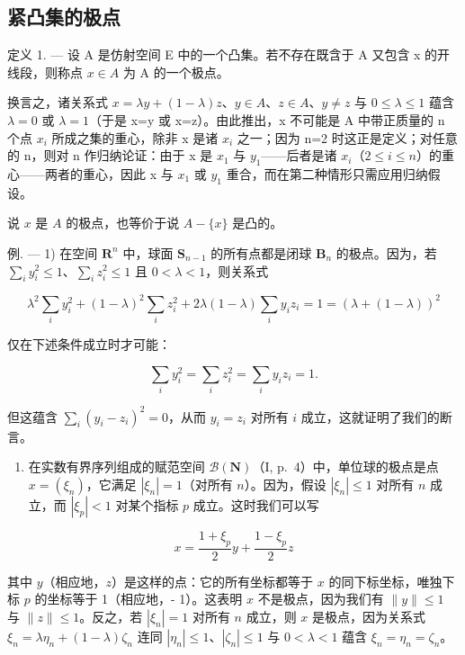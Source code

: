 \subsection{紧凸集的极点}

定义 1. --- 设 A 是仿射空间 E 中的一个凸集。若不存在既含于 A 又包含 x 的开线段，则称点 \(x \in A\) 为 A 的一个极点。

换言之，诸关系式 \(x=\lambda y+(1-\lambda)z\)、\(y\in A\)、\(z\in A\)、\(y\neq z\) 与 \(0\leqslant\lambda\leqslant1\) 蕴含 \(\lambda=0\) 或 \(\lambda=1\)（于是 x=y 或 x=z）。由此推出，x 不可能是 A 中带正质量的 n 个点 \(x_{i}\) 所成之集的重心，除非 x 是诸 \(x_{i}\) 之一；因为 n=2 时这正是定义；对任意的 n，则对 n 作归纳论证：由于 x 是 \(x_{1}\) 与 \(y_{1}\)——后者是诸 \(x_{i}\)（\(2\leqslant i\leqslant n\)）的重心——两者的重心，因此 x 与 \(x_{1}\) 或 \(y_{1}\) 重合，而在第二种情形只需应用归纳假设。

说 \(x\) 是 \(A\) 的极点，也等价于说 \(A - \{x\}\) 是凸的。

例. --- 1) 在空间 \(\mathbf{R}^n\) 中，球面 \(\mathbf{S}_{n-1}\) 的所有点都是闭球 \(\mathbf{B}_n\) 的极点。因为，若 \(\sum_{i} y_i^2 \leqslant 1\)、\(\sum_{i} z_i^2 \leqslant 1\) 且 \(0 < \lambda < 1\)，则关系式

\[
\lambda^ {2} \sum_ {i} y _ {i} ^ {2} + (1 - \lambda) ^ {2} \sum_ {i} z _ {i} ^ {2} + 2 \lambda (1 - \lambda) \sum_ {i} y _ {i} z _ {i} = 1 = (\lambda + (1 - \lambda)) ^ {2}
\]

仅在下述条件成立时才可能：

\[
\sum_ {i} y _ {i} ^ {2} = \sum_ {i} z _ {i} ^ {2} = \sum_ {i} y _ {i} z _ {i} = 1.
\]

但这蕴含 \(\sum_{i}(y_i - z_i)^2 = 0\)，从而 \(y_i = z_i\) 对所有 \(i\) 成立，这就证明了我们的断言。

\begin{enumerate}
\def\labelenumi{\arabic{enumi})}
\setcounter{enumi}{1}
\tightlist
\item
  在实数有界序列组成的赋范空间 \(\mathcal{B}(\mathbf{N})\)（I, p.~4）中，单位球的极点是点 \(x = (\xi_n)\)，它满足 \(|\xi_n| = 1\)（对所有 \(n\)）。因为，假设 \(|\xi_n| \leqslant 1\) 对所有 \(n\) 成立，而 \(|\xi_p| < 1\) 对某个指标 \(p\) 成立。这时我们可以写
\end{enumerate}

\[
x = \frac {1 + \xi_ {p}}{2} y + \frac {1 - \xi_ {p}}{2} z
\]

其中 \(y\)（相应地，\(z\)）是这样的点：它的所有坐标都等于 \(x\) 的同下标坐标，唯独下标 \(p\) 的坐标等于 1（相应地，- 1）。这表明 \(x\) 不是极点，因为我们有 \(\| y \| \leqslant 1\) 与 \(\| z \| \leqslant 1\)。反之，若 \(|\xi_n| = 1\) 对所有 \(n\) 成立，则 \(x\) 是极点，因为关系式 \(\xi_n = \lambda \eta_n + (1 - \lambda) \zeta_n\) 连同 \(|\eta_n| \leqslant 1\)、\(|\zeta_n| \leqslant 1\) 与 \(0 < \lambda < 1\) 蕴含 \(\xi_n = \eta_n = \zeta_n\)。

